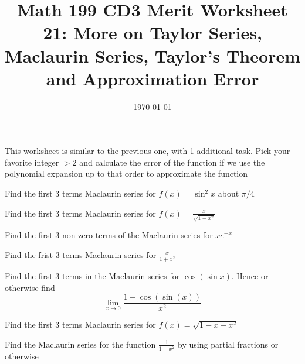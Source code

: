 
\usepackage{fullpage,amsmath,amssymb,amsthm}

\newcommand{\D}{\displaystyle}

\title{Math 199 CD3 Merit Worksheet 21: More on Taylor Series, Maclaurin Series, Taylor's Theorem and Approximation Error}
\date{\today}




\maketitle
 This worksheet is similar to the previous one, with 1 additional task. Pick your favorite integer $>2$ and calculate the error of the function if we use the polynomial expansion up to that order to approximate the function
\be
	\item Find the first 3 terms Maclaurin series for $f(x)= \sin^2 x$ about $\pi/4$

	\vfill

	\item Find the first 3 terms Maclaurin series for $f(x)=\frac{x}{\sqrt{1-x^2}}$

	\vfill

	\item Find the first 3 non-zero terms of the Maclaurin series for $xe^{- x}$

	\vfill
	\item Find the frist 3 terms Maclaurin series for $\frac{x}{1+x^2}$
	\vfill
	\newpage
	\item Find the first 3 terms in the Maclaurin series for $\cos(\sin x)$. Hence or otherwise find 
	$$\lim_{x \to 0}\frac{1-\cos(\sin (x))}{x^2}$$
	\vfill

	\item Find the first 3 terms Maclaurin series for $f(x)=\sqrt{1-x+x^2}$
	\vfill

	\item Find the Maclaurin series for the function $\frac{1}{1-x^2}$ by using partial fractions or otherwise
	\vfill
\ee

